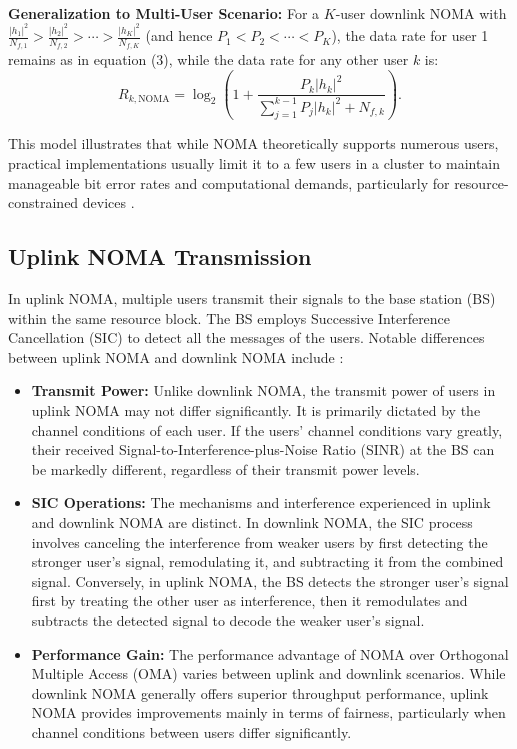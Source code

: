 \\\textbf{Generalization to Multi-User Scenario:}
For a $K$-user downlink NOMA with $\frac{|h_1|^2}{N_{f,1}} > \frac{|h_2|^2}{N_{f,2}} > \cdots > \frac{|h_K|^2}{N_{f,K}}$ (and hence $P_1 < P_2 < \cdots < P_K$), the data rate for user 1 remains as in equation (3), while the data rate for any other user $k$ is:
\[
R_{k,\text{NOMA}} = \log_2 \left(1 + \frac{P_k |h_k|^2}{\sum_{j=1}^{k-1} P_j |h_k|^2 + N_{f,k}}\right). \tag{2.8}
\]

This model illustrates that while NOMA theoretically supports numerous users, practical implementations usually limit it to a few users in a cluster to maintain manageable bit error rates and computational demands, particularly for resource-constrained devices \cite{nomamath}.

\subsection{Uplink NOMA Transmission}
In uplink NOMA, multiple users transmit their signals to the base station (BS) within the same resource block. The BS employs Successive Interference Cancellation (SIC) to detect all the messages of the users. Notable differences between uplink NOMA and downlink NOMA include \cite{nomauplinkvsdownlink}:

\begin{itemize}
    \item \textbf{Transmit Power:} Unlike downlink NOMA, the transmit power of users in uplink NOMA may not differ significantly. It is primarily dictated by the channel conditions of each user. If the users' channel conditions vary greatly, their received Signal-to-Interference-plus-Noise Ratio (SINR) at the BS can be markedly different, regardless of their transmit power levels.
    \item \textbf{SIC Operations:} The mechanisms and interference experienced in uplink and downlink NOMA are distinct. In downlink NOMA, the SIC process involves canceling the interference from weaker users by first detecting the stronger user's signal, remodulating it, and subtracting it from the combined signal. Conversely, in uplink NOMA, the BS detects the stronger user's signal first by treating the other user as interference, then it remodulates and subtracts the detected signal to decode the weaker user's signal.
    \item \textbf{Performance Gain:} The performance advantage of NOMA over Orthogonal Multiple Access (OMA) varies between uplink and downlink scenarios. While downlink NOMA generally offers superior throughput performance, uplink NOMA provides improvements mainly in terms of fairness, particularly when channel conditions between users differ significantly.
\end{itemize}

